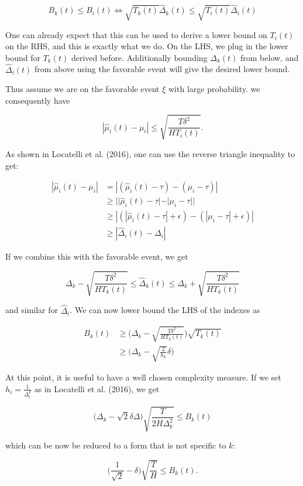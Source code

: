 \documentclass[11pt,]{article}
\begin{document}
\[
B_k(t) \leq B_i(t) \Leftrightarrow \sqrt{T_k(t)}\hat{\Delta}_k(t) \leq \sqrt{T_i(t)} \hat{\Delta}_i(t)
\]

One can already expect that this can be used to derive a lower bound on
\(T_i(t)\) on the RHS, and this is exactly what we do. On the LHS, we
plug in the lower bound for \(T_k(t)\) derived before. Additionally
bounding \(\Delta_k(t)\) from below, and \(\hat{\Delta}_i(t)\) from
above using the favorable event will give the desired lower bound.

Thus assume we are on the favorable event \(\xi\) with large
probability. we consequently have

\[
| \hat{\mu}_i(t) - \mu_i| \leq \sqrt{\frac{T\delta^2}{HT_i(t)}}.
\]

As shown in Locatelli et al. (2016), one can use the reverse triangle
inequality to get:

\begin{align*}
|\hat{\mu}_i(t) - \mu_i| & = |(\hat{\mu}_i(t) - \tau) - (\mu_i - \tau)| \\
& \geq || \hat{\mu}_i(t) - \tau | - |\mu_i - \tau|| \\
& \geq |(|\hat{\mu}_i(t) - \tau| + \epsilon) - (|\mu_i - \tau| + \epsilon)| \\
& \geq |\hat{\Delta}_i(t) - \Delta_i|
\end{align*}

If we combine this with the favorable event, we get

\[
\Delta_k - \sqrt{\frac{T\delta^2}{HT_k(t)}} \leq \hat{\Delta}_k(t) \leq \Delta_k + \sqrt{\frac{T\delta^2}{HT_k(t)}}
\]

and similar for \(\hat{\Delta}_i\). We can now lower bound the LHS of
the indexes as

\begin{align*}
B_k(t) & \geq \Big(\Delta_k - \sqrt{\frac{T\delta^2}{HT_k(t)}}\Big) \sqrt{T_k(t)} \\
& \geq \Big(\Delta_k - \sqrt{\frac{2}{h_k}}\delta \Big)
\end{align*}

At this point, it is useful to have a well chosen complexity measure. If
we set \(h_i = \frac{1}{\Delta_i^2}\) as in Locatelli et al. (2016), we
get

\[
\Big(\Delta_k - \sqrt{2}\delta \Delta \Big) \sqrt{\frac{T}{2H\Delta_k^2}} \leq B_k(t)
\]

which can be now be reduced to a form that is not specific to \(k\):

\[
\Big( \frac{1}{\sqrt{2}} - \delta \Big) \sqrt{\frac{T}{H}} \leq B_k(t).
\]
\end{document}
